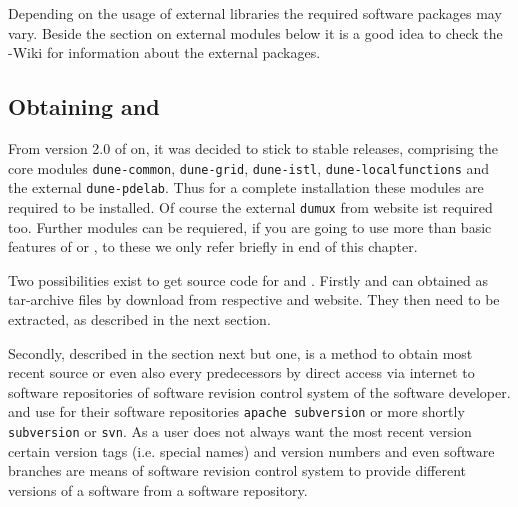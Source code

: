 Depending on the usage of external libraries the required software packages may vary. 
Beside the section on external modules below it is a good idea to check the {\Dune}-Wiki \cite{DUNE-HP} for information about the external packages.

\subsection{Obtaining \Dune and \Dumux}
From version 2.0 of \Dune on, it was decided to stick to stable \Dune releases, comprising the core modules 
\texttt{dune-common}, \texttt{dune-grid}, \texttt{dune-istl}, \texttt{dune-localfunctions} and the external \texttt{dune-pdelab}. Thus for a complete \Dumux installation these modules are required to be installed. Of course the external \texttt{dumux} from \Dumux website ist required too. Further modules can be requiered, if you are going to use more than basic features of \Dune or \Dumux, to these we only refer briefly in end of this chapter.

Two possibilities exist to get source code for \Dune and \Dumux.
Firstly \Dune and \Dumux can obtained as tar-archive files by download from respective {\Dune} and {\Dumux} website. They then need to be extracted, as described in the next section.

Secondly, described in the section next but one, is a method to obtain most recent source or even also every predecessors by direct access via internet to software repositories of software revision control system of the software developer. \Dune and \Dumux use for their software repositories \texttt{apache subversion} or more shortly \texttt{subversion} or \texttt{svn}.
As a user does not always want the most recent version
certain version tags (i.e. special names) and version numbers and even software branches are means of software revision control system to provide different versions of a software from a software repository.

